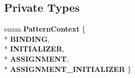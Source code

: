\subsection*{Private Types}
\begin{DoxyCompactItemize}
\item 
enum {\bfseries Pattern\+Context} \{ \\*
{\bfseries B\+I\+N\+D\+I\+NG}, 
\\*
{\bfseries I\+N\+I\+T\+I\+A\+L\+I\+Z\+ER}, 
\\*
{\bfseries A\+S\+S\+I\+G\+N\+M\+E\+NT}, 
\\*
{\bfseries A\+S\+S\+I\+G\+N\+M\+E\+N\+T\+\_\+\+I\+N\+I\+T\+I\+A\+L\+I\+Z\+ER}
 \}\hypertarget{classv8_1_1internal_1_1_parser_1_1_pattern_rewriter_a1ec8a9fd945c7414a58bf30a7ba9199e}{}\label{classv8_1_1internal_1_1_parser_1_1_pattern_rewriter_a1ec8a9fd945c7414a58bf30a7ba9199e}

\end{DoxyCompactItemize}
